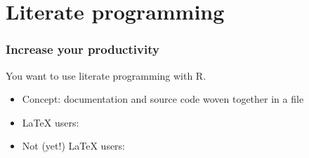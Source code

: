 \section{Literate programming}

\begin{frame}
  \frametitle{Increase your productivity}

  You want to use literate programming with R.
  \begin{itemize}
  \item Concept: documentation and source code woven together in a
    file
  \item {\LaTeX} users:
  \item Not (yet!) {\LaTeX} users:
  \end{itemize}
\end{frame}

